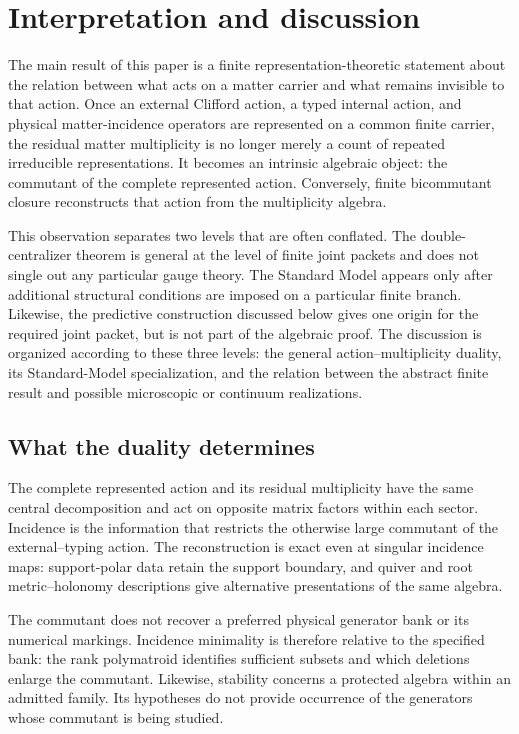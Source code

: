 \documentclass[11pt]{article}
\numberwithin{equation}{section}
\theoremstyle{definition}
\theoremstyle{remark}
\begin{document}
\section{Interpretation and discussion}
\label{sec:discussion}

The main result of this paper is a finite representation-theoretic statement
about the relation between what acts on a matter carrier and what remains
invisible to that action.  Once an external Clifford action, a typed internal
action, and physical matter-incidence operators are represented on a common
finite carrier, the residual matter multiplicity is no longer merely a count
of repeated irreducible representations.  It becomes an intrinsic algebraic
object: the commutant of the complete represented action.  Conversely, finite
bicommutant closure reconstructs that action from the multiplicity algebra.

This observation separates two levels that are often conflated.  The
double-centralizer theorem is general at the level of finite joint packets and
does not single out any particular gauge theory.  The Standard Model appears
only after additional structural conditions are imposed on a particular
finite branch.  Likewise, the predictive construction discussed below gives
one origin for the required joint packet, but is not part of the algebraic
proof.  The discussion is organized according to these three levels:
the general action--multiplicity duality, its Standard-Model specialization,
and the relation between the abstract finite result and possible microscopic
or continuum realizations.


\subsection{What the duality determines}

The complete represented action and its residual multiplicity have the
same central decomposition and act on opposite matrix factors within each
sector.  Incidence is the information that restricts the otherwise large
commutant of the external--typing action.  The reconstruction is exact even
at singular incidence maps: support-polar data retain the support boundary,
and quiver and root metric--holonomy descriptions give alternative
presentations of the same algebra.

The commutant does not recover a preferred physical generator bank or its
numerical markings.  Incidence minimality is therefore relative to the
specified bank: the rank polymatroid identifies sufficient subsets and
which deletions enlarge the commutant.  Likewise, stability concerns a
protected algebra within an admitted family.  Its hypotheses do not provide
occurrence of the generators whose commutant is being studied.
\end{document}

